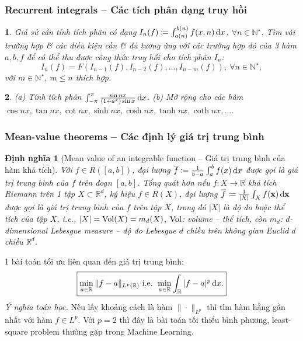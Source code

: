 \documentclass{article}
\newtheorem{baitoan}{}
\newtheorem{dinhnghia}{Định nghĩa}
\begin{document}

\subsubsection{Recurrent integrals -- Các tích phân dạng truy hồi}

\begin{baitoan}
	Giả sử cần tính tích phân có dạng $I_n(f)\coloneqq\int_{a(n)}^{b(n)} f(x,n)\,{\rm d}x$, $\forall n\in\mathbb{N}^\star$. Tìm vài trường hợp \& các điều kiện cần \& đủ tương ứng với các trường hợp đó của 3 hàm $a,b,f$ để có thể thu được công thức truy hồi cho tích phân $I_n$:
	\begin{equation*}
		I_n(f) = F(I_{n-1}(f),I_{n-2}(f),\ldots,I_{n-m}(f)),\ \forall n\in\mathbb{N}^\star,
	\end{equation*}
	với $m\in\mathbb{N}^\star$, $m\le n$ thích hợp.
\end{baitoan}

\begin{baitoan}
	(a) Tính tích phân $\int_{-\pi}^\pi \frac{\sin nx}{(1 + a^x)\sin x}\,{\rm d}x$. (b) Mở rộng cho các hàm $\cos nx,\tan nx,\cot nx,\sinh nx,\cosh nx,\tanh nx,\coth nx,\ldots$.
\end{baitoan}


\subsubsection{Mean-value theorems -- Các định lý giá trị trung bình}

\begin{dinhnghia}[Mean value of an integrable function -- Giá trị trung bình của hàm khả tích]
	Với $f\in R([a,b])$, đại lượng $\overline{f}\coloneqq\frac{1}{b - a}\int_a^b f(x)\,{\rm d}x$ được gọi là {\rm giá trị trung bình} của $f$ trên đoạn $[a,b]$. Tổng quát hơn nếu $f:X\to\mathbb{R}$ khả tích Riemann trên 1 tập $X\subset\mathbb{R}^d$, ký hiệu $f\in R(X)$, đại lượng $\overline{f}\coloneqq\frac{1}{|X|}\int_X f({\bf x})\,{\rm d}{\bf x}$ được gọi là {\rm giá trị trung bình} của $f$ trên tập $X$, trong đó $|X|$ là độ đo hoặc thể tích của tập $X$, i.e., $|X| = {\rm Vol}(X) = m_d(X)$, ${\rm Vol}$: volume -- thể tích, còn $m_d$: $d$-dimensional Lebesgue measure -- độ đo Lebesgue $d$ chiều trên không gian Euclid $d$ chiều $\mathbb{R}^d$.
\end{dinhnghia}
1 bài toán tối ưu liên quan đến giá trị trung bình:
\begin{equation*}
	\boxed{\min_{a\in\mathbb{R}} \|f - a\|_{L^p(\mathbb{R})}\mbox{ i.e. } \min_{a\in\mathbb{R}} \int_\mathbb{R} |f - a|^p\,{\rm d}x.}
\end{equation*}
{\it Ý nghĩa toán học.} Nếu lấy khoảng cách là hàm $\|\cdot\|_{L^p}$ thì tìm hàm hằng gần nhất với hàm $f\in L^p$. Với $p = 2$ thì đây là bài toán tối thiểu bình phương, least-square problem thường gặp trong Machine Learning.
\end{document}

